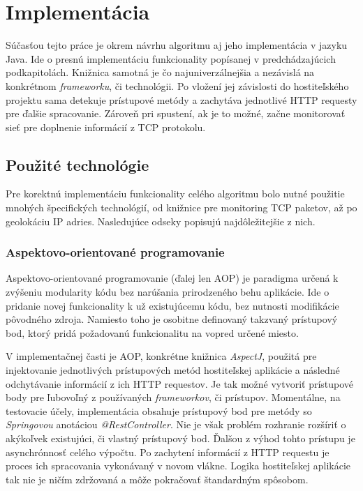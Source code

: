 \documentclass[
  digital, %
  table,   %
  lof,     %
  nolot,   %
  nocover
]{fithesis3}
\begin{document}
\section{Implementácia}
Súčasťou tejto práce je okrem návrhu algoritmu aj jeho implementácia v jazyku
Java. Ide o presnú implementáciu funkcionality popísanej v predchádzajúcich
podkapitolách. Knižnica samotná je čo najuniverzálnejšia a nezávislá na
konkrétnom \textit{frameworku}, či technológii. Po vložení jej závislosti do
hostiteľského projektu sama detekuje prístupové metódy a zachytáva jednotlivé
HTTP requesty pre ďalšie spracovanie. Zároveň pri spustení, ak je to možné,
začne monitorovať sieť pre doplnenie informácií z TCP protokolu.

\subsection{Použité technológie}
Pre korektnú implementáciu funkcionality celého algoritmu bolo nutné použitie
mnohých špecifických technológií, od knižnice pre monitoring TCP paketov, až po
geolokáciu IP adries. Nasledujúce odseky popisujú najdôležitejšie z nich.

\subsubsection{Aspektovo-orientované programovanie}
Aspektovo-orientované programovanie (ďalej len AOP) je paradigma určená k
zvýšeniu modularity kódu bez narúšania prirodzeného behu aplikácie. Ide o 
pridanie novej funkcionality k už existujúcemu kódu, bez nutnosti modifikácie
pôvodného zdroja. Namiesto toho je osobitne definovaný takzvaný prístupový bod,
ktorý pridá požadovanú funkcionalitu na vopred určené miesto.

V implementačnej časti je AOP, konkrétne knižnica \textit{AspectJ}, použitá pre
injektovanie jednotlivých prístupových metód hostiteľskej aplikácie a následné
odchytávanie informácií z ich HTTP requestov. Je tak možné vytvoriť prístupové
body pre ľubovoľný z používaných \textit{frameworkov}, či prístupov. Momentálne, na
testovacie účely, implementácia obsahuje prístupový bod pre metódy so
\textit{Springovou} anotáciou \textit{@RestController}. Nie je však problém
rozhranie rozšíriť o akýkoľvek existujúci, či vlastný prístupový bod. Ďalšou z 
výhod tohto prístupu je asynchrónnosť celého výpočtu. Po zachytení informácií
z HTTP requestu je proces ich spracovania vykonávaný v novom vlákne. Logika
hostiteľskej aplikácie tak nie je ničím zdržovaná a môže pokračovať štandardným
spôsobom.
\end{document}
